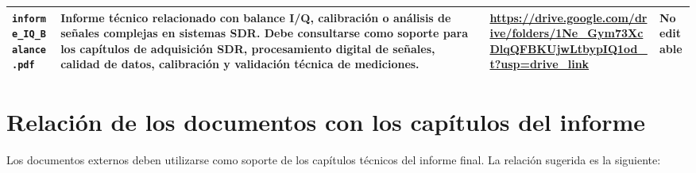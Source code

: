 \begin{longtable}{p{} p{} p{} p{}}
\hline

\texttt{informe\_IQ\_Balance.pdf} &
Informe técnico relacionado con balance I/Q, calibración o análisis de señales complejas en sistemas SDR. Debe consultarse como soporte para los capítulos de adquisición SDR, procesamiento digital de señales, calidad de datos, calibración y validación técnica de mediciones. &
\url{https://drive.google.com/drive/folders/1Ne_Gym73XcDlqQFBKUjwLtbypIQ1od_t?usp=drive_link} &
No editable \\

\hline

\end{longtable}

\section{Relación de los documentos con los capítulos del informe}

Los documentos externos deben utilizarse como soporte de los capítulos técnicos del informe final. La relación sugerida es la siguiente:

